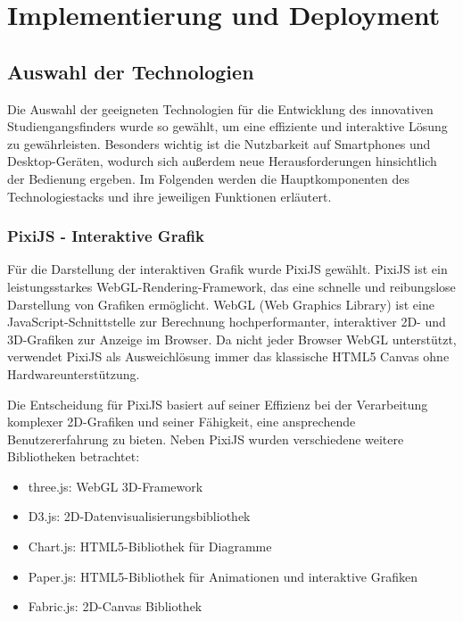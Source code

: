 \section{Implementierung und Deployment}
\subsection{Auswahl der Technologien}
Die Auswahl der geeigneten Technologien für die Entwicklung des innovativen 
Studiengangsfinders wurde so gewählt, um eine effiziente und interaktive Lösung
zu gewährleisten. Besonders wichtig ist die Nutzbarkeit auf
Smartphones und Desktop-Geräten, wodurch sich außerdem neue Herausforderungen
hinsichtlich der Bedienung ergeben. Im Folgenden werden die Hauptkomponenten des
Technologiestacks und ihre jeweiligen Funktionen erläutert.

\subsubsection{PixiJS - Interaktive Grafik}
Für die Darstellung der interaktiven Grafik wurde PixiJS gewählt. PixiJS ist ein leistungsstarkes WebGL-Rendering-Framework, das eine schnelle und reibungslose Darstellung von Grafiken ermöglicht. \parencite{pixijs_pixijs_2023} WebGL (Web Graphics Library) ist eine JavaScript-Schnittstelle zur Berechnung hochperformanter, interaktiver 2D- und 3D-Grafiken zur Anzeige im Browser. \parencite{mozilla_corporation_webgl_2023} Da nicht jeder Browser WebGL unterstützt, verwendet PixiJS als Ausweichlösung immer das klassische HTML5 Canvas ohne Hardwareunterstützung. \parencite{pixijs_pixijs_2024}

Die Entscheidung für PixiJS basiert auf seiner Effizienz bei der Verarbeitung komplexer 2D-Grafiken und seiner Fähigkeit, eine ansprechende Benutzererfahrung zu bieten. Neben PixiJS wurden verschiedene weitere Bibliotheken betrachtet:
\begin{itemize}
    \item three.js: WebGL 3D-Framework
    \item D3.js: 2D-Datenvisualisierungsbibliothek
    \item Chart.js: HTML5-Bibliothek für Diagramme
    \item Paper.js: HTML5-Bibliothek für Animationen und interaktive Grafiken
    \item Fabric.js: 2D-Canvas Bibliothek
\end{itemize}


